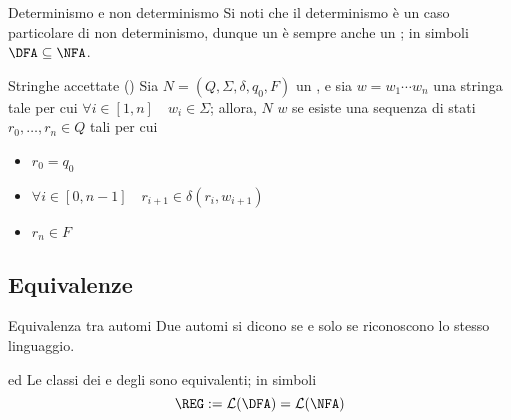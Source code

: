 \documentclass[a4paper, 12pt]{report}
\begin{document}
    \begin{framedobs}[label={non det obs}]{Determinismo e non determinismo}
        Si noti che il determinismo è un caso particolare di non determinismo, dunque un \DFA è sempre anche un \NFA; in simboli $\mathrm{\DFA} \subseteq \mathrm{\NFA}$.
    \end{framedobs}

    \begin{frameddefn}{Stringhe accettate (\NFA)}
        Sia $N = (Q, \Sigma, \delta, q_0, F)$ un \NFA, e sia $w = w_1\cdots w_n$ una stringa tale per cui $\forall i \in [1, n] \quad w_i \in \Sigma$; allora, $N$  $w$ se esiste una sequenza di stati $r_0, \ldots, r_n \in Q$ tali per cui

        \begin{itemize}
            \item $r_0 = q_0$
            \item $\forall i \in [0, n - 1] \quad r_{i + 1} \in \delta(r_i, w_{i + 1})$
            \item $r_n \in F$
        \end{itemize}
    \end{frameddefn}

    \subsection{Equivalenze}

    \begin{frameddefn}{Equivalenza tra automi}
        Due automi si dicono  se e solo se riconoscono lo stesso linguaggio.
    \end{frameddefn}

    \begin{framedthm}[label={nfa equiv}]{\DFA ed \NFA}
        Le classi dei \DFA e degli \NFA sono equivalenti; in simboli $$\REG := \mathcal{L}(\mathrm{\DFA}) = \mathcal{L}(\mathrm{\NFA})$$
    \end{framedthm}
\end{document}
